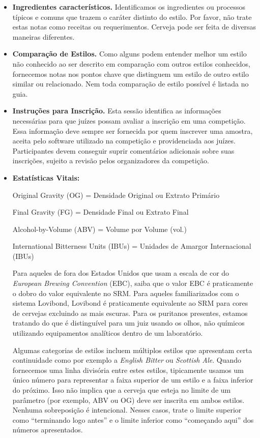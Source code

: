 \begin{itemize}
\item \textbf{Ingredientes característicos.} Identificamos os ingredientes ou processos típicos e comuns que trazem o caráter distinto do estilo. Por favor, não trate estas notas como receitas ou requerimentos. Cerveja pode ser feita de diversas maneiras diferentes.
\item \textbf{Comparação de Estilos.} Como alguns podem entender melhor um estilo não conhecido ao ser descrito em comparação com outros estilos conhecidos, fornecemos notas nos pontos chave que distinguem um estilo de outro estilo similar ou relacionado. Nem toda comparação de estilo possível é listada no guia.
\item \textbf{Instruções para Inscrição.} Esta sessão identifica as informações necessárias para que juízes possam avaliar a inscrição em uma competição. Essa informação deve sempre ser fornecida por quem inscrever uma amostra, aceita pelo software utilizado na competição e providenciada aos juízes. Participantes devem conseguir suprir comentários adicionais sobre suas inscrições, sujeito a revisão pelos organizadores da competição.
\item \textbf{Estatísticas Vitais:}

Original Gravity (OG) = Densidade Original ou Extrato Primário

Final Gravity (FG) = Densidade Final ou Extrato Final

Alcohol-by-Volume (ABV) = Volume por Volume (vol.)

International Bitterness Units (IBUs) = Unidades de Amargor Internacional (IBUs)

Para aqueles de fora dos Estados Unidos que usam a escala de cor do \textit{European Brewing Convention} (EBC), saiba que o valor EBC é praticamente o dobro do valor equivalente no SRM. Para aqueles familiarizados com o sistema Lovibond, Lovibond é praticamente equivalente ao SRM para cores de cervejas excluindo as mais escuras. Para os puritanos presentes, estamos tratando do que é distinguível para um juiz usando os olhos, não químicos utilizando equipamentos analíticos dentro de um laboratório.

Algumas categorias de estilos incluem múltiplos estilos que apresentam certa continuidade como por exemplo a \textit{English Bitter} ou \textit{Scottish Ale}. Quando fornecemos uma linha divisória entre estes estilos, tipicamente usamos um único número para representar a faixa superior de um estilo e a faixa inferior do próximo. Isso não implica que a cerveja que esteja no limite de um parâmetro (por exemplo, ABV ou OG) deve ser inscrita em ambos estilos. Nenhuma sobreposição é intencional. Nesses casos, trate o limite superior como “terminando logo antes” e o limite inferior como “começando aqui” dos números apresentados.


\end{itemize}
